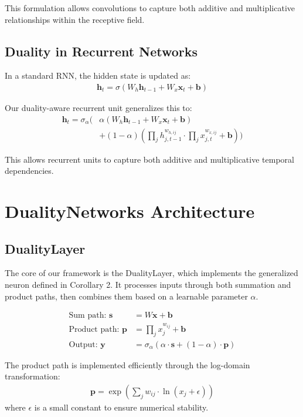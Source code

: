 \documentclass{article}
\begin{document}
This formulation allows convolutions to capture both additive and multiplicative relationships within the receptive field.

\subsection{Duality in Recurrent Networks}

In a standard RNN, the hidden state is updated as:
\begin{align}
\mathbf{h}_t = \sigma(W_h\mathbf{h}_{t-1} + W_x\mathbf{x}_t + \mathbf{b})
\end{align}

Our duality-aware recurrent unit generalizes this to:
\begin{align}
\mathbf{h}_t = \sigma_\alpha(&\alpha(W_h\mathbf{h}_{t-1} + W_x\mathbf{x}_t + \mathbf{b}) \nonumber \\
&+ (1-\alpha)(\prod_j h_{j,t-1}^{w_{h,ij}} \cdot \prod_j x_{j,t}^{w_{x,ij}} + \mathbf{b}))
\end{align}

This allows recurrent units to capture both additive and multiplicative temporal dependencies.

\section{DualityNetworks Architecture}

\subsection{DualityLayer}

The core of our framework is the DualityLayer, which implements the generalized neuron defined in Corollary 2. It processes inputs through both summation and product paths, then combines them based on a learnable parameter $\alpha$.

\begin{align}
\text{Sum path: } \mathbf{s} &= W\mathbf{x} + \mathbf{b} \\
\text{Product path: } \mathbf{p} &= \prod_{j} x_j^{w_{ij}} + \mathbf{b} \\
\text{Output: } \mathbf{y} &= \sigma_\alpha(\alpha \cdot \mathbf{s} + (1-\alpha) \cdot \mathbf{p})
\end{align}

The product path is implemented efficiently through the log-domain transformation:
\begin{align}
\mathbf{p} = \exp(\sum_j w_{ij} \cdot \ln(x_j + \epsilon))
\end{align}
where $\epsilon$ is a small constant to ensure numerical stability.
\end{document}
